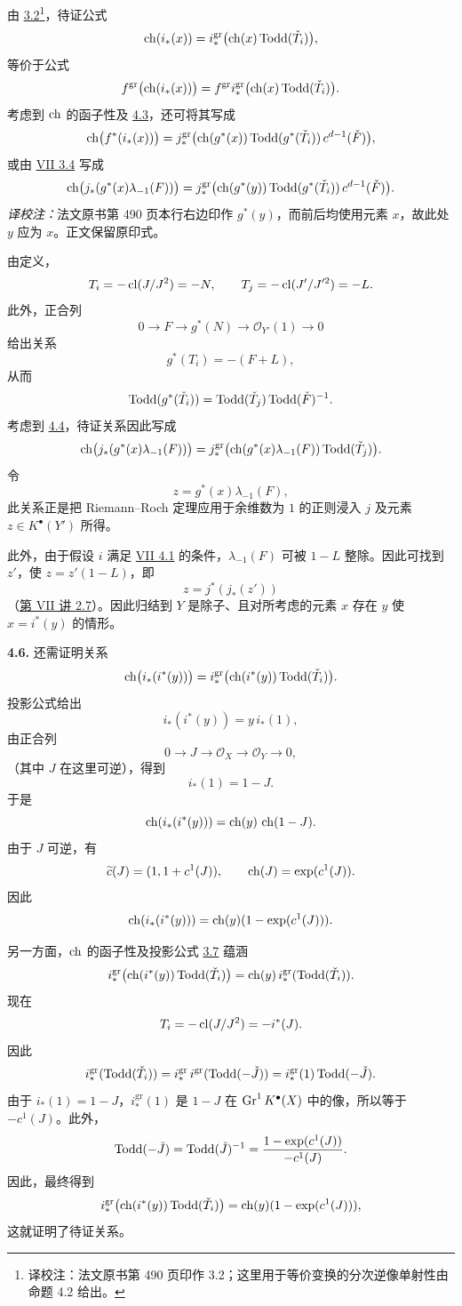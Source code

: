 由 \hyperlink{sga6.e08.prop.3-2}{3.2}\footnote{译校注：法文原书第 490 页印作 3.2；这里用于等价变换的分次逆像单射性由命题 4.2 给出。}，待证公式
\[
 \operatorname{ch}(i_*(x))=
 i^{\mathrm{gr}}_*\bigl(\operatorname{ch}(x)\operatorname{Todd}(\check T_i)\bigr),
\]
等价于公式
\[
 f^{\mathrm{gr}}\bigl(\operatorname{ch}(i_*(x))\bigr)
 =
 f^{\mathrm{gr}}i^{\mathrm{gr}}_*\bigl(\operatorname{ch}(x)\operatorname{Todd}(\check T_i)\bigr).
\]
考虑到 \(\operatorname{ch}\) 的函子性及 \hyperlink{sga6.e08.prop.4-3}{4.3}，还可将其写成
\[
 \operatorname{ch}\bigl(f^*(i_*(x))\bigr)
 =
 j^{\mathrm{gr}}_*\bigl(\operatorname{ch}(g^*(x))\operatorname{Todd}(g^*(\check T_i))\,c^{d-1}(\check F)\bigr),
\]
或由 \hyperlink{sga6.e07.prop.3-4}{VII 3.4} 写成
\[
 \operatorname{ch}\bigl(j_*(g^*(x)\lambda_{-1}(F))\bigr)
 =
 j^{\mathrm{gr}}_*\bigl(\operatorname{ch}(g^*(y))\operatorname{Todd}(g^*(\check T_i))\,c^{d-1}(\check F)\bigr).
\]\noindent\textit{译校注：}法文原书第 490 页本行右边印作 \(g^*(y)\)，而前后均使用元素 \(x\)，故此处 \(y\) 应为 \(x\)。正文保留原印式。

由定义，
\[
 T_i=-\operatorname{cl}(J/J^2)=-N,\qquad
 T_j=-\operatorname{cl}(J'/J'^2)=-L.
\]
此外，正合列
\[
0\longrightarrow F\longrightarrow g^*(N)\longrightarrow \mathcal O_{Y'}(1)\longrightarrow0
\]
给出关系
\[
 g^*(T_i)=-(F+L),
\]
从而
\[
 \operatorname{Todd}(g^*(\check T_i))=\operatorname{Todd}(\check T_j)\operatorname{Todd}(\check F)^{-1}.
\]
考虑到 \hyperlink{sga6.e08.prop.4-4}{4.4}，待证关系因此写成
\[
 \operatorname{ch}\bigl(j_*(g^*(x)\lambda_{-1}(F))\bigr)
 =
 j^{\mathrm{gr}}_*\bigl(\operatorname{ch}(g^*(x)\lambda_{-1}(F))\operatorname{Todd}(\check T_j)\bigr).
\]
令
\[
z=g^*(x)\lambda_{-1}(F),
\]
此关系正是把 Riemann--Roch 定理应用于余维数为 \(1\) 的正则浸入 \(j\) 及元素 \(z\in K^{\bullet}(Y')\) 所得。

此外，由于假设 \(i\) 满足 \hyperlink{sga6.e07.lem.4-1}{VII 4.1} 的条件，\(\lambda_{-1}(F)\) 可被 \(1-L\) 整除。因此可找到 \(z'\)，使 \(z=z'(1-L)\)，即
\[
 z=j^*(j_*(z'))
\]
（\hyperlink{sga6.e07.para.2-6}{第 VII 讲 2.7}）。因此归结到 \(Y\) 是除子、且对所考虑的元素 \(x\) 存在 \(y\) 使 \(x=i^*(y)\) 的情形。

\textbf{4.6.} 还需证明关系
\[
 \operatorname{ch}\bigl(i_*(i^*(y))\bigr)
 =
 i^{\mathrm{gr}}_*\bigl(\operatorname{ch}(i^*(y))\operatorname{Todd}(\check T_i)\bigr).
\]
投影公式给出
\[
 i_*(i^*(y))=y\,i_*(1),
\]
由正合列
\[
0\longrightarrow J\longrightarrow\mathcal O_X\longrightarrow\mathcal O_Y\longrightarrow0,
\]
（其中 \(J\) 在这里可逆），得到
\[
 i_*(1)=1-J.
\]
于是
\[
 \operatorname{ch}(i_*(i^*(y)))=\operatorname{ch}(y)\,\operatorname{ch}(1-J).
\]
由于 \(J\) 可逆，有
\[
 \widetilde c(J)=(1,1+c^1(J)),\qquad \operatorname{ch}(J)=\exp(c^1(J)).
\]
因此
\[
 \operatorname{ch}(i_*(i^*(y)))=\operatorname{ch}(y)(1-\exp(c^1(J))).
\]

另一方面，\(\operatorname{ch}\) 的函子性及投影公式 \hyperlink{sga6.e08.prop.3-7}{3.7} 蕴涵
\[
 i^{\mathrm{gr}}_*\bigl(\operatorname{ch}(i^*(y))\operatorname{Todd}(\check T_i)\bigr)
 =
 \operatorname{ch}(y)\,i^{\mathrm{gr}}_*(\operatorname{Todd}(\check T_i)).
\]
现在
\[
T_i=-\operatorname{cl}(J/J^2)=-i^*(J).
\]
因此
\[
 i^{\mathrm{gr}}_*(\operatorname{Todd}(\check T_i))
 =
 i^{\mathrm{gr}}_*\,i^{\mathrm{gr}}(\operatorname{Todd}(-\check J))
 =
 i^{\mathrm{gr}}_*(1)\operatorname{Todd}(-\check J).
\]
由于 \(i_*(1)=1-J\)，\(i^{\mathrm{gr}}_*(1)\) 是 \(1-J\) 在 \(\operatorname{Gr}^1K^{\bullet}(X)\) 中的像，所以等于 \(-c^1(J)\)。此外，
\[
 \operatorname{Todd}(-\check J)=\operatorname{Todd}(\check J)^{-1}
 =
 \frac{1-\exp(c^1(J))}{-c^1(J)}.
\]
因此，最终得到
\[
 i^{\mathrm{gr}}_*\bigl(\operatorname{ch}(i^*(y))\operatorname{Todd}(\check T_i)\bigr)
 =
 \operatorname{ch}(y)(1-\exp(c^1(J))),
\]
这就证明了待证关系。

